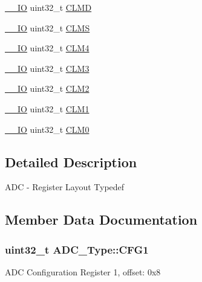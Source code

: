 \begin{DoxyCompactItemize}
\item 
\hyperlink{core__sc300_8h_aec43007d9998a0a0e01faede4133d6be}{\+\_\+\+\_\+\+IO} uint32\+\_\+t \hyperlink{structADC__Type_a7354e8844f8eabbe072fd015e5f321a6}{C\+L\+MD}
\item 
\hyperlink{core__sc300_8h_aec43007d9998a0a0e01faede4133d6be}{\+\_\+\+\_\+\+IO} uint32\+\_\+t \hyperlink{structADC__Type_aaf8e34a694e7cefc2f3f750ec6947658}{C\+L\+MS}
\item 
\hyperlink{core__sc300_8h_aec43007d9998a0a0e01faede4133d6be}{\+\_\+\+\_\+\+IO} uint32\+\_\+t \hyperlink{structADC__Type_ae5a5b0377261f6593f1ad3f51a4681ad}{C\+L\+M4}
\item 
\hyperlink{core__sc300_8h_aec43007d9998a0a0e01faede4133d6be}{\+\_\+\+\_\+\+IO} uint32\+\_\+t \hyperlink{structADC__Type_a8c1d865925f38226c6c93f502abfc32d}{C\+L\+M3}
\item 
\hyperlink{core__sc300_8h_aec43007d9998a0a0e01faede4133d6be}{\+\_\+\+\_\+\+IO} uint32\+\_\+t \hyperlink{structADC__Type_a2c52931453e9fab0bd1fa24a5e771a8c}{C\+L\+M2}
\item 
\hyperlink{core__sc300_8h_aec43007d9998a0a0e01faede4133d6be}{\+\_\+\+\_\+\+IO} uint32\+\_\+t \hyperlink{structADC__Type_a87b7c165ef9dc4d4b5db9a15ff39b3f1}{C\+L\+M1}
\item 
\hyperlink{core__sc300_8h_aec43007d9998a0a0e01faede4133d6be}{\+\_\+\+\_\+\+IO} uint32\+\_\+t \hyperlink{structADC__Type_a8700ba0357efc8ee2066ff4906a196b2}{C\+L\+M0}
\end{DoxyCompactItemize}


\subsection{Detailed Description}
A\+DC -\/ Register Layout Typedef 

\subsection{Member Data Documentation}
\subsubsection[{\texorpdfstring{C\+F\+G1}{CFG1}}]{ uint32\+\_\+t A\+D\+C\+\_\+\+Type\+::\+C\+F\+G1}\hypertarget{structADC__Type_a440cce9a58e10f21220241a51442b71c}{}\label{structADC__Type_a440cce9a58e10f21220241a51442b71c}
A\+DC Configuration Register 1, offset\+: 0x8 
